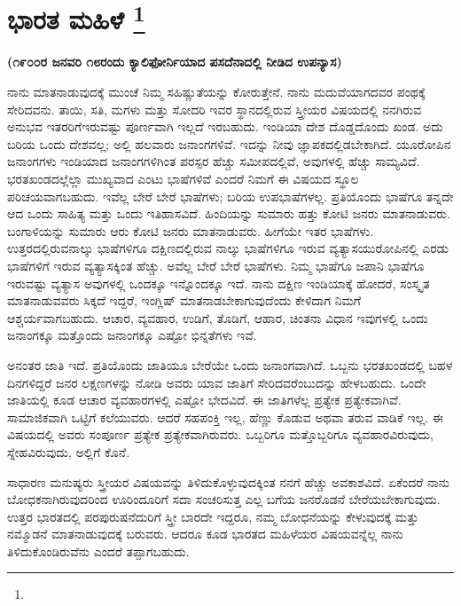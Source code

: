 
\chapter[ಭಾರತ ಮಹಿಳೆ ]{ಭಾರತ ಮಹಿಳೆ \protect\footnote{}}

\centerline{\textbf{(೧೯೦೦ರ ಜನವರಿ ೧೮ರಂದು ಕ್ಯಾಲಿಫೋರ್ನಿಯಾದ ಪಸದೆನಾದಲ್ಲಿ ನೀಡಿದ ಉಪನ್ಯಾಸ)}}

\vskip 0.3cm

ನಾನು ಮಾತನಾಡುವುದಕ್ಕೆ ಮುಂಚೆ ನಿಮ್ಮ ಸಹಿಷ್ಣುತೆಯನ್ನು ಕೋರುತ್ತೇನೆ. ನಾನು ಮದುವೆಯಾಗದವರ ಪಂಥಕ್ಕೆ ಸೇರಿದವನು. ತಾಯಿ, ಸತಿ, ಮಗಳು ಮತ್ತು ಸೋದರಿ ಇವರ ಸ್ಥಾನದಲ್ಲಿರುವ ಸ್ತ್ರೀಯರ ವಿಷಯದಲ್ಲಿ ನನಗಿರುವ ಅನುಭವ ಇತರರಿಗೆ\break ಇರುವಷ್ಟು ಪೂರ್ಣವಾಗಿ ಇಲ್ಲದೆ ಇರಬಹುದು. ಇಂಡಿಯಾ ದೇಶ ದೊಡ್ಡದೊಂದು ಖಂಡ. ಅದು ಬರಿಯ ಒಂದು ದೇಶವಲ್ಲ; ಅಲ್ಲಿ ಹಲವಾರು ಜನಾಂಗಗಳಿವೆ. ಇದನ್ನು ನೀವು ಜ್ಞಾಪಕದಲ್ಲಿಡಬೇಕಾಗಿದೆ. ಯೂರೋಪಿನ ಜನಾಂಗಗಳು ಇಂಡಿಯಾದ ಜನಾಂಗ\-ಗಳಿಗಿಂತ ಪರಸ್ಪರ ಹೆಚ್ಚು ಸಮೀಪದಲ್ಲಿವೆ, ಅವುಗಳಲ್ಲಿ ಹೆಚ್ಚು ಸಾಮ್ಯವಿದೆ. ಭರತಖಂಡದಲ್ಲೆಲ್ಲಾ ಮುಖ್ಯವಾದ ಎಂಟು ಭಾಷೆಗಳಿವೆ ಎಂದರೆ ನಿಮಗೆ ಈ ವಿಷಯದ ಸ್ಥೂಲ ಪರಿಚಯವಾಗಬಹುದು. ಇವೆಲ್ಲ ಬೇರೆ ಬೇರೆ ಭಾಷೆಗಳು; ಬರಿಯ ಉಪಭಾಷೆಗಳಲ್ಲ. ಪ್ರತಿಯೊಂದು ಭಾಷೆಗೂ ತನ್ನದೇ ಆದ ಒಂದು ಸಾಹಿತ್ಯ ಮತ್ತು ಒಂದು ಇತಿಹಾಸವಿದೆ. ಹಿಂದಿಯನ್ನು ಸುಮಾರು ಹತ್ತು ಕೋಟಿ ಜನರು ಮಾತನಾಡುವರು. ಬಂಗಾಳಿಯನ್ನು ಸುಮಾರು ಆರು ಕೋಟಿ ಜನರು ಮಾತನಾಡುವರು. ಹೀಗೆಯೇ ಇತರ ಭಾಷೆಗಳು. ಉತ್ತರದಲ್ಲಿರುವ\break ನಾಲ್ಕು ಭಾಷೆಗಳಿಗೂ ದಕ್ಷಿಣದಲ್ಲಿರುವ ನಾಲ್ಕು ಭಾಷೆಗಳಿಗೂ ಇರುವ ವ್ಯತ್ಯಾಸ\break ಯುರೋಪಿನಲ್ಲಿ ಎರಡು ಭಾಷೆಗಳಿಗೆ ಇರುವ ವ್ಯತ್ಯಾಸಕ್ಕಿಂತ ಹೆಚ್ಚು. ಅವೆಲ್ಲ ಬೇರೆ ಬೇರೆ ಭಾಷೆಗಳು. ನಿಮ್ಮ ಭಾಷೆಗೂ ಜಪಾನಿ ಭಾಷೆಗೂ ಇರುವಷ್ಟು ವ್ಯತ್ಯಾಸ ಅವುಗಳಲ್ಲಿ ಒಂದಕ್ಕೂ ಇನ್ನೊಂದಕ್ಕೂ ಇದೆ. ನಾನು ದಕ್ಷಿಣ ಇಂಡಿಯಾಕ್ಕೆ ಹೋದರೆ, ಸಂಸ್ಕೃತ ಮಾತನಾಡುವವರು ಸಿಕ್ಕದೆ ಇದ್ದರೆ, ಇಂಗ್ಲಿಷ್​ ಮಾತನಾಡಬೇಕಾಗುವುದೆಂದು ಕೇಳಿದಾಗ ನಿಮಗೆ ಆಶ್ಚರ್ಯವಾಗಬಹುದು. ಆಚಾರ, ವ್ಯವಹಾರ, ಉಡಿಗೆ, ತೊಡಿಗೆ, ಆಹಾರ, ಚಿಂತನಾ ವಿಧಾನ ಇವುಗಳಲ್ಲಿ ಒಂದು ಜನಾಂಗಕ್ಕೂ ಮತ್ತೊಂದು ಜನಾಂಗಕ್ಕೂ ಎಷ್ಟೋ ಭಿನ್ನತೆಗಳು ಇವೆ.

ಅನಂತರ ಜಾತಿ ಇದೆ. ಪ್ರತಿಯೊಂದು ಜಾತಿಯೂ ಬೇರೆಯೇ ಒಂದು ಜನಾಂಗವಾಗಿದೆ. ಒಬ್ಬನು ಭರತಖಂಡದಲ್ಲಿ ಬಹಳ ದಿನಗಳಿದ್ದರೆ ಜನರ ಲಕ್ಷಣಗಳನ್ನು ನೋಡಿ ಅವರು ಯಾವ ಜಾತಿಗೆ ಸೇರಿದವರೆಂಬುದನ್ನು ಹೇಳಬಹುದು. ಒಂದೇ ಜಾತಿಯಲ್ಲಿ ಕೂಡ ಆಚಾರ ವ್ಯವಹಾರಗಳಲ್ಲಿ ಎಷ್ಟೋ ಭೇದವಿದೆ. ಈ ಜಾತಿಗಳೆಲ್ಲ ಪ್ರತ್ಯೇಕ ಪ್ರತ್ಯೇಕವಾಗಿವೆ. ಸಾಮಾಜಿಕವಾಗಿ ಒಟ್ಟಿಗೆ ಕಲೆಯುವರು. ಆದರೆ ಸಹಪಂಕ್ತಿ ಇಲ್ಲ, ಹೆಣ್ಣು ಕೊಡುವ ಅಥವಾ ತರುವ ವಾಡಿಕೆ ಇಲ್ಲ. ಈ ವಿಷಯದಲ್ಲಿ ಅವರು ಸಂಪೂರ್ಣ ಪ್ರತ್ಯೇಕ ಪ್ರತ್ಯೇಕವಾಗಿರುವರು. ಒಬ್ಬರಿಗೂ ಮತ್ತೊಬ್ಬರಿಗೂ ವ್ಯವಹಾರವಿರುವುದು, ಸ್ನೇಹವಿರುವುದು, ಅಲ್ಲಿಗೆ ಕೊನೆ.

ಸಾಧಾರಣ ಮನುಷ್ಯರು ಸ್ತ್ರೀಯರ ವಿಷಯವನ್ನು ತಿಳಿದುಕೊಳ್ಳುವುದಕ್ಕಿಂತ ನನಗೆ ಹೆಚ್ಚು ಅವಕಾಶವಿದೆ. ಏಕೆಂದರೆ ನಾನು ಬೋಧಕನಾಗಿರುವುದರಿಂದ ಊರಿಂದೂರಿಗೆ ಸದಾ ಸಂಚರಿಸುತ್ತ ಎಲ್ಲ ಬಗೆಯ ಜನರೊಡನೆ ಬೇರೆಯಬೇಕಾಗುವುದು. ಉತ್ತರ ಭಾರತದಲ್ಲಿ ಪರಪುರುಷನೆದುರಿಗೆ ಸ್ತ್ರೀ ಬಾರದೇ ಇದ್ದರೂ, ನಮ್ಮ ಬೋಧನೆಯನ್ನು ಕೇಳುವುದಕ್ಕೆ ಮತ್ತು ನಮ್ಮೊಡನೆ ಮಾತನಾಡುವುದಕ್ಕೆ ಬರುವರು. ಆದರೂ ಕೂಡ ಭಾರತದ ಮಹಿಳೆಯರ ವಿಷಯವನ್ನೆಲ್ಲ ನಾನು ತಿಳಿದುಕೊಂಡಿರುವೆನು ಎಂದರೆ ತಪ್ಪಾಗಬಹುದು.


